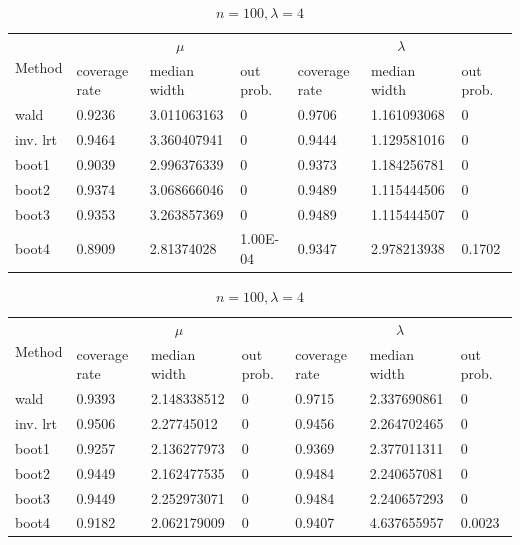\documentclass{article}
\begin{document}
\begin{table}
        \begin{subtable}[b]{\textwidth}
		\centering
		\begin{tabular}{l|lll|lll}
		\toprule
        \multirow{2}{*}{Method} & \multicolumn{3}{c|}{$\mu$}      & \multicolumn{3}{c}{$\lambda$}  \\ 
                           & coverage rate & median width & out prob. & coverage rate & median width & out prob. \\
                           \midrule
wald      & 0.9236	&3.011063163  &	0        & 0.9706	&1.161093068	&0     \\
inv. lrt  & 0.9464	&3.360407941  &	0        & 0.9444	&1.129581016	&0     \\
boot1     & 0.9039	&2.996376339  &	0        & 0.9373	&1.184256781	&0     \\
boot2     & 0.9374	&3.068666046  &	0        & 0.9489	&1.115444506	&0     \\
boot3     & 0.9353	&3.263857369  &	0        & 0.9489	&1.115444507	&0     \\
boot4     & 0.8909	&2.81374028	  & 1.00E-04 & 0.9347	&2.978213938	&0.1702\\
       \bottomrule
       \end{tabular}
       \caption{$n = 100, \lambda = 2$}
       \label{100_2}
       \end{subtable}%

        \begin{subtable}[b]{\textwidth}
		\centering
		\begin{tabular}{l|lll|lll}
		\toprule
        \multirow{2}{*}{Method} & \multicolumn{3}{c|}{$\mu$}      & \multicolumn{3}{c}{$\lambda$}  \\ 
                           & coverage rate & median width & out prob. & coverage rate & median width & out prob. \\
                           \midrule
wald      & 0.9393	&2.148338512   	&0 & 0.9715	&2.337690861	&0     \\
inv. lrt  & 0.9506	&2.27745012	    &0 & 0.9456	&2.264702465	&0     \\
boot1     & 0.9257	&2.136277973   	&0 & 0.9369	&2.377011311	&0     \\
boot2     & 0.9449	&2.162477535   	&0 & 0.9484	&2.240657081	&0     \\
boot3     & 0.9449	&2.252973071   	&0 & 0.9484	&2.240657293	&0     \\
boot4     & 0.9182	&2.062179009   	&0 & 0.9407	&4.637655957	&0.0023\\
       \bottomrule
       \end{tabular}
       \caption{$n = 100, \lambda = 4$}
       \label{100_4}
       \end{subtable}%


\end{table}
\end{document}
